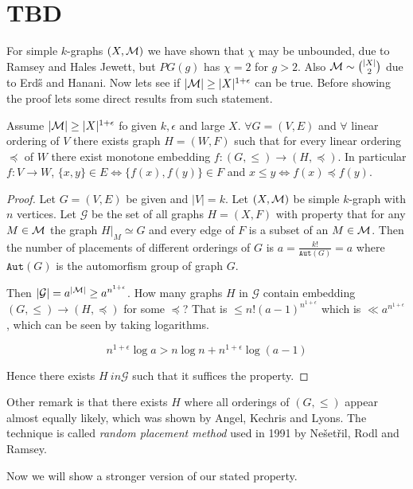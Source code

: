 \chapter{TBD}

For simple $k$-graphs $(X, \mathcal{M})$ we have shown that $\chi$ may be unbounded, due to Ramsey and Hales Jewett, but $PG(g)$ has $\chi = 2$ for $g > 2$. Also $\mathcal{M} \sim \binom{|X|}{2}$ due to Erd\H s and Hanani. Now lets see if $|\mathcal{M}| \geq |X|^{1 + \epsilon}$ can be true. Before showing the proof lets some direct results from such statement.

\begin{thm}
	Assume $|\mathcal{M}| \geq |X|^{1 + \epsilon}$ fo given $k, \epsilon$ and large $X$. $\forall G = (V,E)$ and $\forall$ linear ordering of $V$ there exists graph $H = (W,F)$ such that for every linear ordering $\preceq$ of $W$ there exist monotone embedding $f : (G, \leq) \to (H, \preceq)$. In particular $f : V \to W$, $\{x,y\} \in E \iff \{f(x), f(y)\} \in F$ and $x \leq y \iff f(x) \preceq f(y)$.
\end{thm}

\begin{proof}
	Let $G = (V,E)$ be given and $|V| = k$. Let $(X, \mathcal{M})$ be simple $k$-graph with $n$ vertices. Let $\mathcal{G}$ be the set of all graphs $H = (X,F)$ with property that for any $M \in \mathcal{M}$ the graph $H|_M \simeq G$ and every edge of $F$ is a subset of an $M \in \mathcal{M}$. Then the number of placements of different orderings of $G$ is $a = \frac{k!}{\mathtt{Aut}(G)} = a$ where $\mathtt{Aut}(G)$ is the automorfism group of graph $G$.
	
	Then $|\mathcal{G}| = a^{|\mathcal{M}|} \geq a^{n^{1+\epsilon}}$. How many graphs $H$ in $\mathcal{G}$ contain embedding $(G, \leq) \to (H, \preceq)$ for some $\preceq$? That is $\leq n! (a - 1)^{n^{1+\epsilon}}$ which is $\ll a^{n^{1+\epsilon}}$, which can be seen by taking logarithms.
	
	$$
	n^{1 + \epsilon} \log a > n \log n + n^{1 + \epsilon} \log(a-1)
	$$
	
	\noindent Hence there exists $H \ in \mathcal{G}$ such that it suffices the property.
\end{proof}

Other remark is that there exists $H$ where all orderings of $(G, \leq)$ appear almost equally likely, which was shown by Angel, Kechris and Lyons. The technique is called \textit{random placement method} used in 1991 by Nešetřil, Rodl and Ramsey.

Now we will show a stronger version of our stated property.

